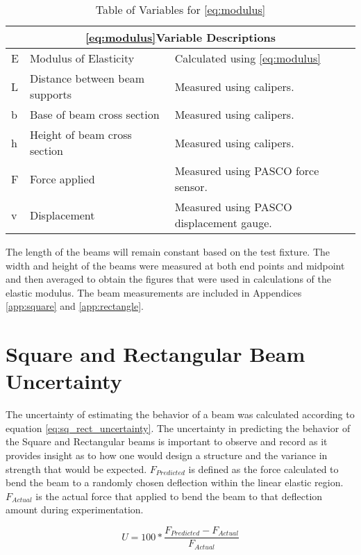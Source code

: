 \begin{table} [h]
	\centering
	\begin{tabularx}{\textwidth}{ l | l | X}
		\multicolumn{3}{c}{\textbf{\eqref{eq:modulus}Variable Descriptions}} \\ \hline
		E & Modulus of Elasticity & Calculated using \eqref{eq:modulus}\\
		L & Distance between beam supports & Measured using calipers.\\
		b & Base of beam cross section & Measured using calipers. \\
		h & Height of beam cross section & Measured using calipers.\\
		F & Force applied & Measured using PASCO force sensor. \\
		v & Displacement & Measured using PASCO displacement gauge. \\
	\end{tabularx}
	\label{tab:variables}
	\captionsetup{textformat=empty,labelformat=blank}
	\caption{Table of Variables for \eqref{eq:modulus}}
\end{table}
\par
The length of the beams will remain constant based on the test fixture. The width and height of the beams were measured at both end points and midpoint and then averaged to obtain the figures that were used in calculations of the elastic modulus. The beam measurements are included in Appendices \ref{app:square} and \ref{app:rectangle}.

\section{Square and Rectangular Beam Uncertainty}
The uncertainty of estimating the behavior of a beam was calculated according to equation \ref{eq:sq_rect_uncertainty}. The uncertainty in predicting the behavior of the Square and Rectangular beams is important to observe and record as it provides insight as to how one would design a structure and the variance in strength that would be expected. $F_{Predicted}$ is defined as the force calculated to bend the beam to a randomly chosen deflection within the linear elastic region. $F_{Actual}$ is the actual force that applied to bend the beam to that deflection amount during experimentation.

\begin{equation}\label{eq:sq_rect_uncertainty}
U = 100*\frac{F_{Predicted}-F_{Actual}}{F_{Actual}}
\end{equation}

